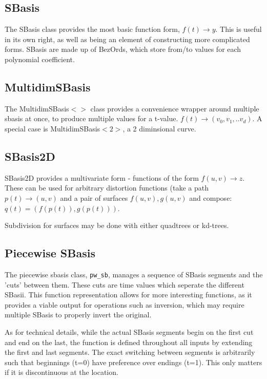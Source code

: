 \documentclass{book}
\newcommand{\code}[1]{\textsf{#1}}
\begin{document}
\subsection{SBasis}
The \code{SBasis} class provides the most basic function form,
$f(t) \rightarrow y$.  This is useful in its own right, as well as being an
element of constructing more complicated forms.  \code{SBasis} are made
up of \code{BezOrd}s, which store from/to values for each polynomial
coefficient.

\subsection{MultidimSBasis}
The \code{MultidimSBasis$<>$} class provides a convenience wrapper
around multiple sbasis at once, to produce multiple values for a t-value.
$f(t) \rightarrow (v_0, v_1, .. v_d)$.  A special case is \code{MultidimSBasis$<2>$},
a 2 diminsional curve.

\subsection{SBasis2D}
SBasis2D provides a multivariate form - functions of the form
$f(u,v) \rightarrow z$.  These can be used for arbitrary distortion
functions (take a path $p(t) \rightarrow (u,v)$ and a pair of surfaces
$f(u,v),g(u,v)$ and compose: $q(t) = (f(p(t)), g(p(t)))$.

Subdivision for surfaces may be done with either quadtrees or kd-trees.

\subsection{Piecewise SBasis}
The piecewise sbasis class, \verb#pw_sb#, manages a sequence of SBasis
segments and the 'cuts' between them.  These cuts are time values which
seperate the different SBasii.  This function representation allows for
more interesting functions, as it provides a viable output for operations
such as inversion, which may require multiple SBasis to properly invert
the original.

As for technical details, while the actual SBasis segments begin on the
first cut and end on the last, the function is defined throughout all
inputs by extending the first and last segments.  The exact switching
between segments is arbitrarily such that beginnings (t=0) have
preference over endings (t=1).  This only matters if it is discontinuous
at the location.
\end{document}
